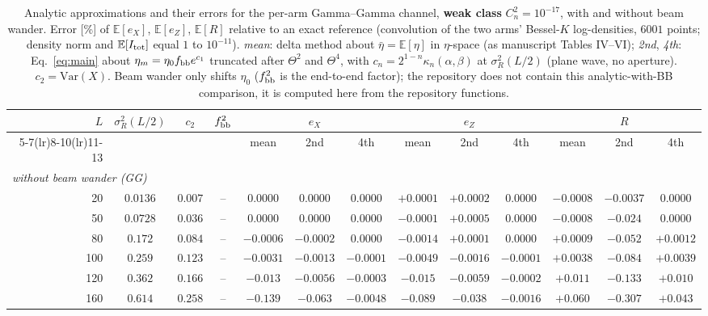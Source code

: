 \documentclass[11pt,a4paper]{article}
\theoremstyle{plain}
\theoremstyle{remark}
\begin{document}
\begin{table}[htbp]
\centering\scriptsize
\caption{Analytic approximations and their errors for the per-arm Gamma--Gamma channel, \textbf{weak class} $C_n^2=10^{-17}$, with and without beam wander. Error [\%] of $\mathbb E[e_X]$, $\mathbb E[e_Z]$, $\mathbb E[R]$ relative to an exact reference (convolution of the two arms' Bessel-$K$ log-densities, $6001$ points; density norm and $\mathbb E[I_{\rm tot}]$ equal $1$ to $10^{-11}$). \emph{mean}: delta method about $\bar\eta=\mathbb E[\eta]$ in $\eta$-space (as manuscript Tables IV--VI); \emph{2nd}, \emph{4th}: Eq.~\eqref{eq:main} about $\eta_m=\eta_0f_{\rm bb}e^{c_1}$ truncated after $\Theta^2$ and $\Theta^4$, with $c_n=2^{1-n}\kappa_n(\alpha,\beta)$ at $\sigma_R^2(L/2)$ (plane wave, no aperture). $c_2=\mathrm{Var}(X)$. Beam wander only shifts $\eta_0$ ($f_{\rm bb}^2$ is the end-to-end factor); the repository does not contain this analytic-with-BB comparison, it is computed here from the repository functions.}
\label{tab:perarm-weak}
\begin{tabular}{rcccccccccccc}
\toprule
$L$ & $\sigma_R^2(L/2)$ & $c_2$ & $f_{\rm bb}^2$ & \multicolumn{3}{c}{$e_X$} & \multicolumn{3}{c}{$e_Z$} & \multicolumn{3}{c}{$R$}\\
\cmidrule(lr){5-7}\cmidrule(lr){8-10}\cmidrule(lr){11-13}
 & & & & mean & 2nd & 4th & mean & 2nd & 4th & mean & 2nd & 4th\\
\midrule
\multicolumn{13}{l}{\emph{without beam wander (GG)}} \\
20 & $0.0136$ & $0.007$ & -- & $0.0000$ & $0.0000$ & $0.0000$ & $+0.0001$ & $+0.0002$ & $0.0000$ & $-0.0008$ & $-0.0037$ & $0.0000$ \\
50 & $0.0728$ & $0.036$ & -- & $0.0000$ & $0.0000$ & $0.0000$ & $-0.0001$ & $+0.0005$ & $0.0000$ & $-0.0008$ & $-0.024$ & $0.0000$ \\
80 & $0.172$ & $0.084$ & -- & $-0.0006$ & $-0.0002$ & $0.0000$ & $-0.0014$ & $+0.0001$ & $0.0000$ & $+0.0009$ & $-0.052$ & $+0.0012$ \\
100 & $0.259$ & $0.123$ & -- & $-0.0031$ & $-0.0013$ & $-0.0001$ & $-0.0049$ & $-0.0016$ & $-0.0001$ & $+0.0038$ & $-0.084$ & $+0.0039$ \\
120 & $0.362$ & $0.166$ & -- & $-0.013$ & $-0.0056$ & $-0.0003$ & $-0.015$ & $-0.0059$ & $-0.0002$ & $+0.011$ & $-0.133$ & $+0.010$ \\
160 & $0.614$ & $0.258$ & -- & $-0.139$ & $-0.063$ & $-0.0048$ & $-0.089$ & $-0.038$ & $-0.0016$ & $+0.060$ & $-0.307$ & $+0.043$ \\

\end{tabular}
\end{table}
\end{document}
